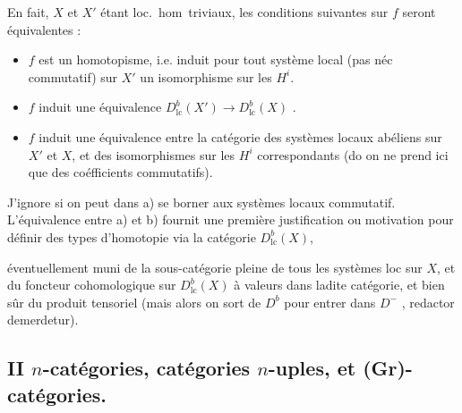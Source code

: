 \documentclass[11pt,a4paper]{article}
\begin{document}
En fait, $X$ et $X'$ étant loc.\ hom\ triviaux, les conditions suivantes
sur $f$ seront équivalentes :
\begin{itemize}
\item[a)] $f$ est un homotopisme, i.e. induit pour tout système local (pas néc
commutatif) sur $X'$ un isomorphisme sur les $H^{i}$.
\item[b)] $f$ induit une équivalence
$D^{b}_{\mathrm{lc}}(X') \to D^{b}_{\mathrm{lc}}(X)$ .
\item[a')] $f$ induit une équivalence entre la catégorie des systèmes locaux
abéliens sur $X'$ et $X$, et des isomorphismes sur les $H^{i}$ correspondants
(do on ne prend ici que des coéfficients commutatifs).
\end{itemize}

J'ignore si on peut dans a) se borner aux systèmes locaux commutatif.
L'équivalence entre a) et b) fournit une première justification ou motivation
pour définir des types d'homotopie via la catégorie
$D^{b}_{\mathrm{lc}}(X)$,

éventuellement muni de la sous-catégorie pleine de tous les systèmes loc
sur $X$, et du foncteur cohomologique sur $D^{b}_{\mathrm{lc}}(X)$ à valeurs
dans ladite catégorie, et bien sûr du produit tensoriel (mais alors on sort de
$D^{b}$ pour entrer dans $D^{-}$ , redactor demerdetur).

\subsection*{II \quad $n$-catégories, catégories $n$-uples, et (Gr)-catégories.}
\end{document}
